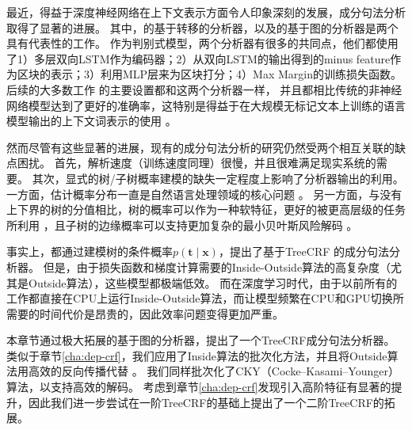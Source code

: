最近，得益于深度神经网络在上下文表示方面令人印象深刻的发展，成分句法分析取得了显著的进展。
其中，\citet{cross-huang-2016-span}的基于转移的分析器，以及\citet{stern-etal-2017-minimal}的基于图的分析器是两个具有代表性的工作。
作为判别式模型，两个分析器有很多的共同点，他们都使用了1）多层双向LSTM作为编码器；2）从双向LSTM的输出得到的minus feature作为区块的表示；3）利用MLP层来为区块打分；4）Max Margin的训练损失函数。
后续的大多数工作 \citep{gaddy-etal-2018-whats,kitaev-klein-2018-constituency}的主要设置都和这两个分析器一样， 并且都相比传统的非神经网络模型达到了更好的准确率，这特别是得益于在大规模无标记文本上训练的语言模型输出的上下文词表示的使用 \citep{peters-etal-2018-deep,devlin-etal-2019-bert}。

然而尽管有这些显著的进展，现有的成分句法分析的研究仍然受两个相互关联的缺点困扰。
首先，解析速度（训练速度同理）很慢，并且很难满足现实系统的需要。
其次，显式的树/子树概率建模的缺失一定程度上影响了分析器输出的利用。
一方面，估计概率分布一直是自然语言处理领域的核心问题 \citep{le-zuidema-2014-inside}。
另一方面，与没有上下界的树的分值相比，树的概率可以作为一种软特征，更好的被更高层级的任务所利用 \citep{jin-etal-2020-relation}，且子树的边缘概率可以支持更加复杂的最小贝叶斯风险解码 \citep{smith-smith-2007-probabilistic}。

事实上，\citet{finkel-etal-2008-efficient,durrett-klein-2015-neural}都通过建模树的条件概率$p(\boldsymbol{t}\mid\boldsymbol{x})$，提出了基于TreeCRF \citep{lafferty-etal-2001-crf}的成分句法分析器。
但是，由于损失函数和梯度计算需要的Inside-Outside算法的高复杂度（尤其是Outside算法），这些模型都极端低效。
而在深度学习时代，由于以前所有的工作都直接在CPU上运行Inside-Outside算法，而让模型频繁在CPU和GPU切换所需要的时间代价是昂贵的，因此效率问题变得更加严重。

本章节通过极大拓展\citet{stern-etal-2017-minimal}的基于图的分析器，提出了一个TreeCRF成分句法分析器。
类似于章节\ref{cha:dep-crf}，我们应用了Inside算法的批次化方法，并且将Outside算法用高效的反向传播代替 \citep{eisner-2016-inside}。
我们同样批次化了CKY（Cocke–Kasami–Younger）算法，以支持高效的解码。
考虑到章节\ref{cha:dep-crf}发现引入高阶特征有显著的提升，因此我们进一步尝试在一阶TreeCRF的基础上提出了一个二阶TreeCRF的拓展。

